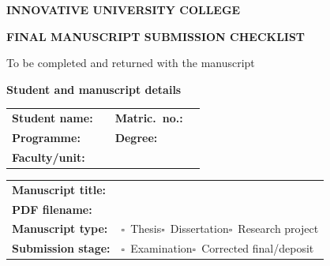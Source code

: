 \documentclass[11pt,a4paper]{article}
\renewcommand\arraystretch{1.2}
\newif\ifiucstrip \iucstriptrue
\newcommand\cbox{$\square$}
\begin{document}
\clearpage
\iucstripfalse
\thispagestyle{empty}
\label{sec:checklist}
\begin{center}
  {\sffamily\bfseries\large INNOVATIVE UNIVERSITY COLLEGE\par}\vspace{6pt}
  {\sffamily\bfseries\Large FINAL MANUSCRIPT SUBMISSION CHECKLIST\par}\vspace{4pt}
  {\sffamily\small To be completed and returned with the manuscript\par}
\end{center}
\vspace{2pt}

\vspace{8pt}
{\large\bfseries Student and manuscript details\par}\vspace{4pt}
\renewcommand\arraystretch{1.9}
\begin{tabularx}{\textwidth}{@{}p{32mm}X p{25mm}p{32mm}@{}}
\textbf{Student name:} & \hrulefill & \textbf{Matric.\ no.:} & \hrulefill \\
\textbf{Programme:}    & \hrulefill & \textbf{Degree:}       & \hrulefill \\
\textbf{Faculty/unit:} & \hrulefill & & \\
\end{tabularx}
\begin{tabularx}{\textwidth}{@{}p{34mm}X@{}}
\textbf{Manuscript title:} & \hrulefill \\
\textbf{PDF filename:}     & \hrulefill \\
\textbf{Manuscript type:}  & \cbox~Thesis\qquad \cbox~Dissertation\qquad \cbox~Research project \\
\textbf{Submission stage:} & \cbox~Examination\qquad \cbox~Corrected final/deposit \\
\end{tabularx}
\renewcommand\arraystretch{1.2}
\end{document}
